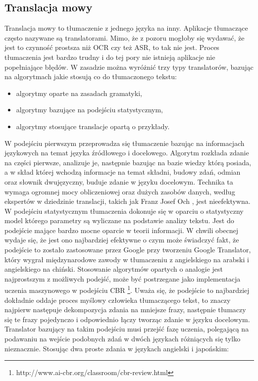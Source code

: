 \subsection{Translacja mowy}
Translacja mowy to tłumaczenie z jednego języka na inny. Aplikacje tłumaczące często nazywane są translatorami. Mimo, że z pozoru mogłoby się wydawać, że jest to czynność prostsza niż OCR czy też ASR, to tak nie jest. Proces tłumaczenia jest bardzo trudny i do tej pory nie istnieją aplikacje nie popełniające błędów. W zasadzie można wyróżnić trzy typy translatorów, bazując na algorytmach jakie stosują co do tłumaczonego tekstu:
\begin{itemize}
	\item algorytmy oparte na zasadach gramatyki,
	\item algorytmy bazujące na podejściu statystycznym,
	\item algorytmy stosujące translacje opartą o przykłady.
\end{itemize}
W podejściu pierwszym przeprowadza się tłumaczenie bazując na informacjach językowych na temat języka źródłowego i docelowego. Algorytm rozkłada zdanie na części pierwsze, analizuje je, następnie bazując na bazie wiedzy którą posiada, a w skład której wchodzą informacje na temat składni, budowy zdań, odmian oraz słownik dwujęzyczny, buduje zdanie w języku docelowym. Technika ta wymaga ogromnej mocy obliczeniowej oraz dużych zasobów danych, według ekspertów w dziedzinie translacji, takich jak Franz Josef Och \cite{och2003}, jest nieefektywna.
W podejściu statystycznym tłumaczenia dokonuje się w oparciu o statystyczny model którego parametry są wyliczane na podstawie analizy tekstu. Jest do podejście mające bardzo mocne oparcie w teorii informacji. W chwili obecnej wydaje się, że jest ono najbardziej efektywne o czym może świadczyć fakt, że podejście to zostało zastosowane przez Google przy tworzeniu Google Translator, który wygrał międzynarodowe zawody w tłumaczeniu z angielskiego na arabski i angielskiego na chiński.
Stosowanie algorytmów opartych o analogie jest najprostszym z możliwych podejść, może być postrzegane jako implementacja uczenia maszynowego w podejściu CBR \footnote{http://www.ai-cbr.org/classroom/cbr-review.html}. Uważa się, że podejście to najbardziej dokładnie oddaje proces myślowy człowieka tłumaczącego tekst, to znaczy najpierw następuje dekompozycja zdania na mniejsze frazy, następnie tłumaczy się te frazy pojedynczo i odpowiednio łączy tworząc zdanie w języku docelowym. Translator bazujący na takim podejściu musi przejść fazę uczenia, polegającą na podawaniu na wejście podobnych zdań w dwóch językach różniących się tylko nieznacznie. Stosując dwa proste zdania w językach angielski i japońskim: 
